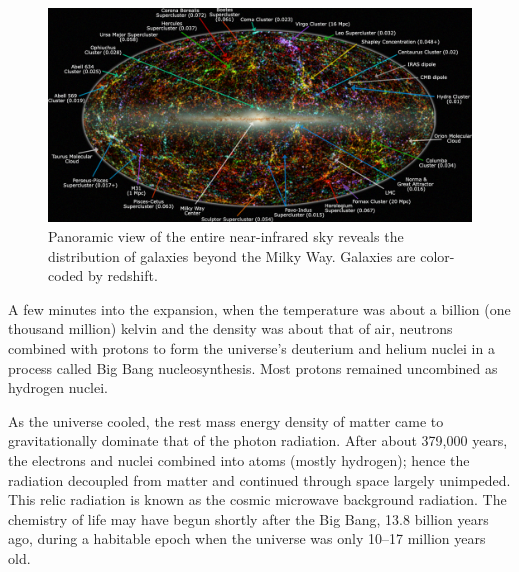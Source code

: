 \documentclass[14pt, oneside]{book}
\begin{document}
		\begin{figure}
			\centering
			\includegraphics[width=0.9\linewidth]{images/near-infrared.jpg}
			\caption{Panoramic view of the entire near-infrared sky reveals the distribution of galaxies beyond the Milky Way. Galaxies are color-coded by redshift.}
			\label{img:redshift}
		\end{figure}

		A few minutes into the expansion, when the temperature was about a billion (one thousand million) kelvin and the density was about that of air, neutrons combined with protons to form the universe's deuterium and helium nuclei in a process called Big Bang nucleosynthesis. Most protons remained uncombined as hydrogen nuclei.

		As the universe cooled, the rest mass energy density of matter came to gravitationally dominate that of the photon radiation. After about 379,000 years, the electrons and nuclei combined into atoms (mostly hydrogen); hence the radiation decoupled from matter and continued through space largely unimpeded. This relic radiation is known as the cosmic microwave background radiation. The chemistry of life may have begun shortly after the Big Bang, 13.8 billion years ago, during a habitable epoch when the universe was only 10–17 million years old. 
\end{document}
